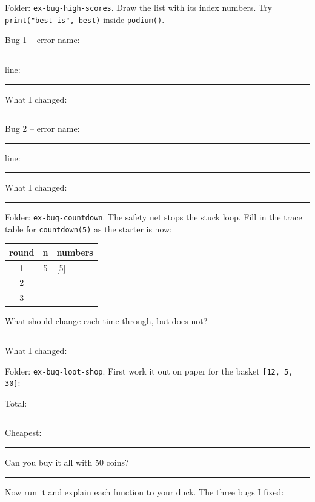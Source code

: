 \begin{exercise}
Folder: \texttt{ex-bug-high-scores}. Draw the list with its index numbers. Try \texttt{print("best is", best)} inside \texttt{podium()}.\par
Bug 1 -- error name: \rule{3.5cm}{0.4pt}\quad line: \rule{1.5cm}{0.4pt}\par
What I changed: \rule{8cm}{0.4pt}\par\medskip
Bug 2 -- error name: \rule{3.5cm}{0.4pt}\quad line: \rule{1.5cm}{0.4pt}\par
What I changed: \rule{8cm}{0.4pt}
\end{exercise}

\begin{exercise}
Folder: \texttt{ex-bug-countdown}. The safety net stops the stuck loop. Fill in the trace table for \texttt{countdown(5)} as the starter is now:
\begin{center}
\renewcommand{\arraystretch}{1.4}
\begin{tabular}{|c|c|p{4cm}|}
\hline \textbf{round} & \textbf{n} & \textbf{numbers} \\ \hline
1 & 5 & [5] \\ \hline
2 & & \\ \hline
3 & & \\ \hline
\end{tabular}
\end{center}
What should change each time through, but does not? \rule{6cm}{0.4pt}\par
What I changed: 
\end{exercise}

\begin{exercise}
Folder: \texttt{ex-bug-loot-shop}. First work it out on paper for the basket \texttt{[12, 5, 30]}:\par
Total: \rule{1.5cm}{0.4pt}\quad Cheapest: \rule{1.5cm}{0.4pt}\quad Can you buy it all with 50 coins? \rule{1.5cm}{0.4pt}\par
Now run it and explain each function to your duck. The three bugs I fixed:
\end{exercise}

